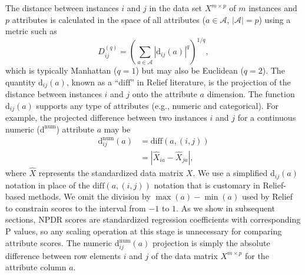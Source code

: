 \documentclass[10pt,letterpaper]{article}\usepackage[]{graphicx}\usepackage[]{color}
\def\ri{R_i}
\def\rj{R_j}
\begin{document}
The distance between instances $i$ and $j$ in the data set $X^{m \times p}$ of $m$ instances and $p$ attributes is calculated in the space of all attributes ($a \in \mathcal{A}$, $|\mathcal{A}|=p$) using a metric such as
\begin{equation}\label{eq:D}
D^{(q)}_{ij}=\left(\sum_{a\in \mathcal{A}}|\text{d}_{ij}(a)|^q\right)^{1/q},
\end{equation}
which is typically Manhattan ($q=1$) but may also be Euclidean ($q=2$). The quantity 
$\text{d}_{ij}(a)$,
known as a ``$\text{diff}$'' in Relief literature, is the projection of the distance between instances $i$ and $j$ onto the attribute $a$ dimension. The 
function $\text{d}_{ij}(a)$ supports any type of attributes
(e.g., numeric and categorical).
For example, the projected difference between two instances $i$ and $j$ for a continuous numeric ($\text{d}^{\text{num}}$) attribute $a$ may be
\begin{equation}\label{eq:diff}
\begin{aligned}
\text{d}^{\text{num}}_{ij}(a)&=\text{diff}(a,(i,j))\\
                                            & = {|\hat{X}_{ia}-\hat{X}_{ja}|},
\end{aligned}
\end{equation}
where $\hat{X}$ represents the standardized data matrix $X$.
We use a simplified d$_{ij}(a)$ notation in place of the $\text{diff}(a,(i,j))$ notation that is customary in Relief-based methods.
We omit the division by $\max(a)-\min(a)$ used by Relief to constrain scores to the interval from $-1$ to $1$.
As we show in subsequent sections, NPDR scores are standardized regression coefficients with corresponding P values, so any scaling operation at this stage is unnecessary for comparing attribute scores. 
The numeric d$^{\text{num}}_{ij}(a)$ projection is simply the absolute difference between row elements $i$ and $j$ of the data matrix $X^{m \times p}$ for the attribute column $a$. 
\end{document}
